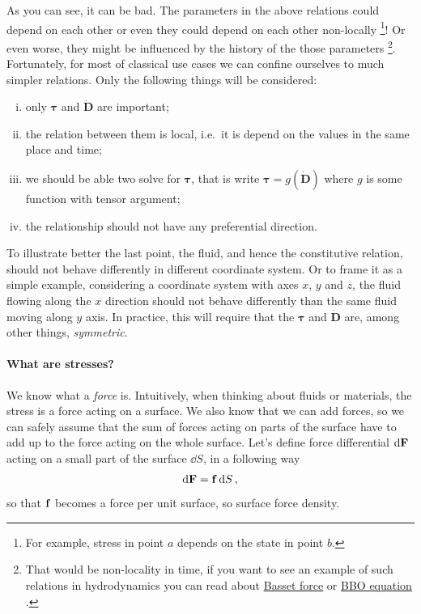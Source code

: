 \documentclass[a4paper]{article}
\newcommand{\wikilink}[2][Wikipedia]{%
  \href{https://en.wikipedia.org/wiki/#2}{#1}%
}
\begin{document}
As you can see, it can be bad. The parameters in the above relations could
depend on each other or even they could depend on each other non-locally%
\footnote{%
	For example, stress in point \(a\) depends on the state in point \(b\).
}!
Or even worse, they might be influenced by the history of the those parameters%
\footnote{%
	That would be non-locality in time, if you want to see an example of such
	 relations in hydrodynamics you can read about
	\wikilink[Basset force]{Basset\_force} or \wikilink[BBO
		equation]{Basset-Boussinesq-Oseen\_equation}.
}.
Fortunately, for most of classical use cases we can confine ourselves to much
simpler relations. Only the following things will be considered:
\begin{enumerate}[(i)]
	\item only \(\bm{\tau}\) and \(\dot{\bm{D}}\) are important;
  \item the relation between them is local, i.e.\ it is depend on the values in
    the same place and time;
  \item we should be able two solve for \(\bm{\tau}\), that is write 
    \(\bm{\tau} = g(\dot{\bm{D}})\) where \(g\) is some function with tensor argument;
	\item the relationship should not have any preferential direction. 
\end{enumerate}
To illustrate better the last point, the fluid, and hence the constitutive
relation, should not behave differently in different coordinate system. Or to
frame it as a simple example, considering a coordinate system with axes \(x\),
\(y\) and \(z\), the fluid flowing along the \(x\) direction should not behave
differently than the same fluid moving along \(y\) axis. In practice, this will
require that the \(\bm{\tau}\) and \(\dot{\bm{D}}\) are, among other things,
\emph{symmetric}.

\paragraph{What are stresses?}
We know what a \emph{force} is. Intuitively,
when thinking about fluids or materials, the stress is a force acting on
a surface. We also know that we can add forces, so we can safely assume that
the sum of forces acting on parts of the surface have to add up to the force
acting on the whole surface. Let's define force differential \(\dd{\vb{F}}\) acting
on a small part of the surface \(\dd S\), in a following way
\[
	\dd \vb{F} = \vb{f}\dd{S},
\]
so that \(\vb{f}\) becomes a force per unit surface, so surface force density.
\end{document}

